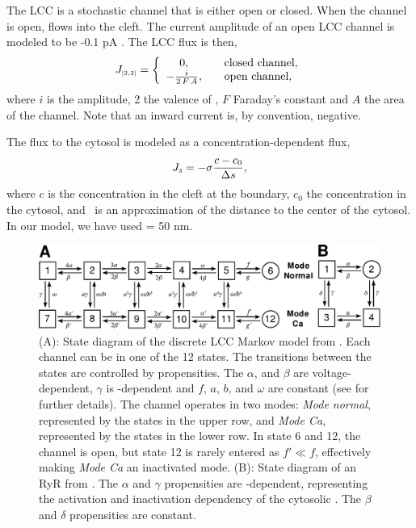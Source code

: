 The LCC is a stochastic channel that is either open or closed. When
the channel is open, \Ca flows into the cleft. The current amplitude
of an open LCC channel is modeled to be -0.1 pA
\citep{GuiaSternLakattaEtAl2001}. The LCC flux is then,
\begin{equation}
\label{eq:hake:constant-current-flux}
J_{\scriptscriptstyle[2,3]}= \left\{
  \begin{array}{c@{\quad\quad}l}
    0,& \text{closed channel},\\
    - \frac{i}{2\,F\,A},& \text{open channel},
  \end{array}
\right.
\end{equation}
\noindent where $i$ is the amplitude, 2 the valence of \Ca, $F$
Faraday's constant and $A$ the area of the channel. Note that an
inward current is, by convention, negative.

The flux to the cytosol is modeled as a concentration-dependent flux,
\begin{equation}
  \label{eq:hake:conc-dependent-flux}
  J_{\scriptscriptstyle 3}= -\sigma\frac{c - c_0}{\Delta{}s},
\end{equation}
where $c$ is the concentration in the cleft at the boundary, $c_0$ the
concentration in the cytosol, and \Ds~is an approximation of the
distance to the center of the cytosol. In our model, we have used \Ds
= 50 nm.

\begin{figure}
  \label{fig:hake:markov-models}
  \center
  \includegraphics[height=\largefig]{chapters/hake/pdf/markov_models}
  \caption[Discrete markov models]{(A): State diagram of the
    discrete LCC Markov model from \citet{JafriRiceWinslow1998}. Each
    channel can be in one of the 12 states.  The transitions between
    the states are controlled by propensities. The $\alpha$, and
    $\beta$ are voltage-dependent, $\gamma$ is \CaC-dependent and $f$,
    $a$, $b$, and $\omega$ are constant (see
    \citet{JafriRiceWinslow1998} for further details). The channel
    operates in two modes: \textit{Mode normal}, represented by the
    states in the upper row, and \textit{Mode Ca}, represented by the
    states in the lower row. In state 6 and 12, the channel is open,
    but state 12 is rarely entered as $f'\ll{}f$, effectively making
    \textit{Mode Ca} an inactivated mode. (B): State diagram
    of an RyR from \citet{SternSongEtAl1999}. The $\alpha$ and
    $\gamma$ propensities are \Ca-dependent, representing the
    activation and inactivation dependency of the cytosolic \CaC. The
    $\beta$ and $\delta$ propensities are constant.}
\end{figure}

